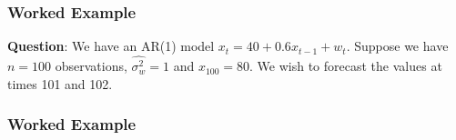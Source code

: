 \documentclass[%
xcolor=pdftex]{beamer}
\begin{document}
\begin{frame}
\frametitle{Worked Example}

\textbf{Question}: We have an AR(1) model $x_t = 40 + 0.6 x_{t-1} + w_t$. Suppose we have $n=100$ observations, $\hat{\sigma_w^2} = 1$ and $x_{100} = 80$. We wish to forecast the values at times 101 and 102.

\vspace{40mm}



\end{frame}

\begin{frame}
\frametitle{Worked Example}


\end{frame}
\end{document}
